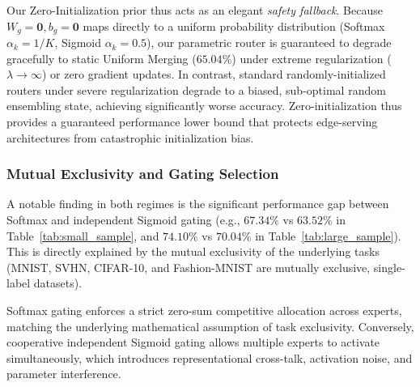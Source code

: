 Our Zero-Initialization prior thus acts as an elegant \emph{safety fallback}. Because $W_g = \mathbf{0}, b_g = \mathbf{0}$ maps directly to a uniform probability distribution (Softmax $\alpha_k = 1/K$, Sigmoid $\alpha_k = 0.5$), our parametric router is guaranteed to degrade gracefully to static Uniform Merging ($65.04\%$) under extreme regularization ($\lambda \to \infty$) or zero gradient updates. In contrast, standard randomly-initialized routers under severe regularization degrade to a biased, sub-optimal random ensembling state, achieving significantly worse accuracy. Zero-initialization thus provides a guaranteed performance lower bound that protects edge-serving architectures from catastrophic initialization bias.

\subsubsection{Mutual Exclusivity and Gating Selection}
A notable finding in both regimes is the significant performance gap between Softmax and independent Sigmoid gating (e.g., $67.34\%$ vs $63.52\%$ in Table~\ref{tab:small_sample}, and $74.10\%$ vs $70.04\%$ in Table~\ref{tab:large_sample}). This is directly explained by the mutual exclusivity of the underlying tasks (MNIST, SVHN, CIFAR-10, and Fashion-MNIST are mutually exclusive, single-label datasets). 

Softmax gating enforces a strict zero-sum competitive allocation across experts, matching the underlying mathematical assumption of task exclusivity. Conversely, cooperative independent Sigmoid gating allows multiple experts to activate simultaneously, which introduces representational cross-talk, activation noise, and parameter interference. 

